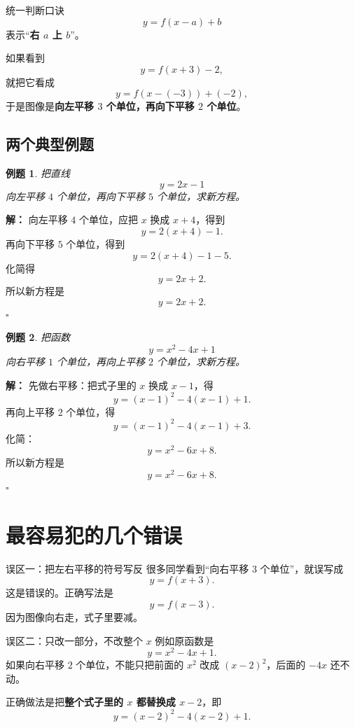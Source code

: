 \documentclass[11pt,a4paper,fontset=fandol]{ctexart}
\theoremstyle{formaltheorem}
\theoremstyle{formalexample}
\newtheorem{example}{例题}[section]
\newenvironment{solution}{\par\noindent\textbf{解：}}{\hfill$\square$\par}
\begin{document}
\begin{skillbox}{统一判断口诀}
\[
y=f(x-a)+b
\]
表示“\textbf{右 $a$ 上 $b$}”。

如果看到
\[
y=f(x+3)-2,
\]
就把它看成
\[
y=f(x-(-3))+(-2),
\]
于是图像是\textbf{向左平移 $3$ 个单位，再向下平移 $2$ 个单位}。
\end{skillbox}

\subsection{两个典型例题}

\begin{example}
把直线
\[
y=2x-1
\]
向左平移 $4$ 个单位，再向下平移 $5$ 个单位，求新方程。
\end{example}

\begin{solution}
向左平移 $4$ 个单位，应把 $x$ 换成 $x+4$，得到
\[
y=2(x+4)-1.
\]
再向下平移 $5$ 个单位，得到
\[
y=2(x+4)-1-5.
\]
化简得
\[
y=2x+2.
\]
所以新方程是
\[
\boxed{y=2x+2}.
\]
\end{solution}

\begin{example}
把函数
\[
y=x^2-4x+1
\]
向右平移 $1$ 个单位，再向上平移 $2$ 个单位，求新方程。
\end{example}

\begin{solution}
先做右平移：把式子里的 $x$ 换成 $x-1$，得
\[
y=(x-1)^2-4(x-1)+1.
\]
再向上平移 $2$ 个单位，得
\[
y=(x-1)^2-4(x-1)+3.
\]
化简：
\[
y=x^2-6x+8.
\]
所以新方程是
\[
\boxed{y=x^2-6x+8}.
\]
\end{solution}

\section{最容易犯的几个错误}

\begin{notebox}{误区一：把左右平移的符号写反}
很多同学看到“向右平移 $3$ 个单位”，就误写成
\[
y=f(x+3).
\]
这是错误的。正确写法是
\[
y=f(x-3).
\]
因为图像向右走，式子里要减。
\end{notebox}

\begin{notebox}{误区二：只改一部分，不改整个 $x$}
例如原函数是
\[
y=x^2-4x+1.
\]
如果向右平移 $2$ 个单位，不能只把前面的 $x^2$ 改成 $(x-2)^2$，后面的 $-4x$ 还不动。

正确做法是把\textbf{整个式子里的 $x$ 都替换成 $x-2$}，即
\[
y=(x-2)^2-4(x-2)+1.
\]
\end{notebox}
\end{document}
